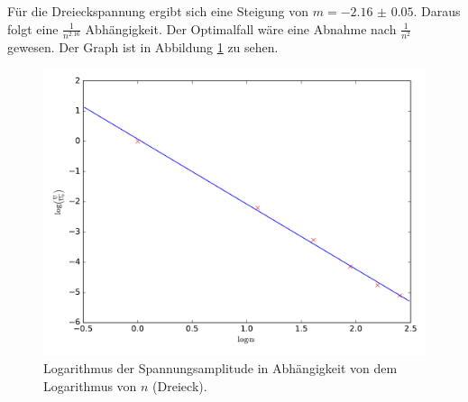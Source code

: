 \documentclass[
  bibliography=totoc,     %
  captions=tableheading,  %
  titlepage=firstiscover, %
]{scrartcl}
\begin{document}
\clearpage
Für die Dreieckspannung ergibt sich eine Steigung von $m = \num{-2.16(5)}$. Daraus
folgt eine $\frac{1}{n^{2.16}}$ Abhängigkeit. Der Optimalfall wäre eine Abnahme
nach $\frac{1}{n^2}$ gewesen. Der Graph ist in Abbildung \ref{fig:plot3} zu sehen.
\begin{figure}
  \centering
  \includegraphics[width=\textwidth]{Dreieck.pdf}
  \caption{Logarithmus der Spannungsamplitude in Abhängigkeit von dem Logarithmus von $n$ (Dreieck).}
  \label{fig:plot3}
\end{figure}
\clearpage
\end{document}
